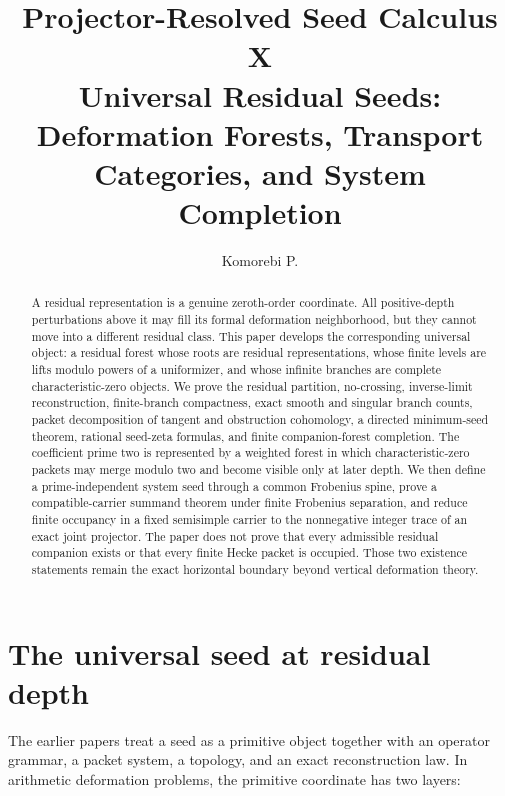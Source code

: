 \documentclass[11pt]{article}
\title{\textbf{Projector-Resolved Seed Calculus X}\\[0.35em]
\large Universal Residual Seeds: Deformation Forests, Transport Categories, and System Completion}
\author{Komorebi P.}
\date{}
\theoremstyle{definition}
\theoremstyle{remark}
\begin{document}
\KomorebiCover
{}



\begin{abstract}
A residual representation is a genuine zeroth-order coordinate.  All positive-depth perturbations above it may fill its formal deformation neighborhood, but they cannot move into a different residual class.  This paper develops the corresponding universal object: a residual forest whose roots are residual representations, whose finite levels are lifts modulo powers of a uniformizer, and whose infinite branches are complete characteristic-zero objects.  We prove the residual partition, no-crossing, inverse-limit reconstruction, finite-branch compactness, exact smooth and singular branch counts, packet decomposition of tangent and obstruction cohomology, a directed minimum-seed theorem, rational seed-zeta formulas, and finite companion-forest completion.  The coefficient prime two is represented by a weighted forest in which characteristic-zero packets may merge modulo two and become visible only at later depth.  We then define a prime-independent system seed through a common Frobenius spine, prove a compatible-carrier summand theorem under finite Frobenius separation, and reduce finite occupancy in a fixed semisimple carrier to the nonnegative integer trace of an exact joint projector.  The paper does not prove that every admissible residual companion exists or that every finite Hecke packet is occupied.  Those two existence statements remain the exact horizontal boundary beyond vertical deformation theory.
\end{abstract}


\clearpage
\tableofcontents
\newpage

\section{The universal seed at residual depth}

The earlier papers treat a seed as a primitive object together with an operator grammar, a packet system, a topology, and an exact reconstruction law.  In arithmetic deformation problems, the primitive coordinate has two layers:
\end{document}
